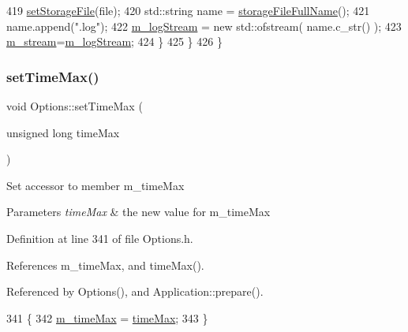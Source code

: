 \begin{DoxyCode}
419                                 \hyperlink{classOptions_ac163281337998af5ca3b7a9617337fef}{setStorageFile}(file);
420                                 std::string name = \hyperlink{classOptions_a68c501133588cd4b1c80219adb926e8d}{storageFileFullName}();
421                                 name.append(\textcolor{stringliteral}{".log"});
422                                 \hyperlink{classOptions_a65c3a025880fb38373b599b87d600eef}{m\_logStream} = \textcolor{keyword}{new} std::ofstream( name.c\_str() );
423                                 \hyperlink{classOptions_a8c5485cd614fa90de6b1aa85a7d2191b}{m\_stream}=\hyperlink{classOptions_a65c3a025880fb38373b599b87d600eef}{m\_logStream};
424                         \}
425                 \}
426         \}
\end{DoxyCode}
\mbox{\label{classOptions_aaa921f68319ea83b5c5a13e37a831c7a}} 
\subsubsection{\texorpdfstring{set\+Time\+Max()}{setTimeMax()}}
{\footnotesize\ttfamily void Options\+::set\+Time\+Max (\begin{DoxyParamCaption}\item[{unsigned long}]{time\+Max }\end{DoxyParamCaption})\hspace{0.3cm}{\ttfamily [inline]}}

Set accessor to member m\+\_\+time\+Max 
\begin{DoxyParams}{Parameters}
{\em time\+Max} & the new value for m\+\_\+time\+Max \\
\hline
\end{DoxyParams}


Definition at line 341 of file Options.\+h.



References m\+\_\+time\+Max, and time\+Max().



Referenced by Options(), and Application\+::prepare().


\begin{DoxyCode}
341                                                 \{
342                 \hyperlink{classOptions_a2584abb6745a082f73e2917732cd00e1}{m\_timeMax} = \hyperlink{classOptions_a4569b8790af48109c8639bec7b626fa6}{timeMax};
343         \}
\end{DoxyCode}
\mbox{\label{classOptions_afcd7b27fdf474050d912571e09525efe}} 

